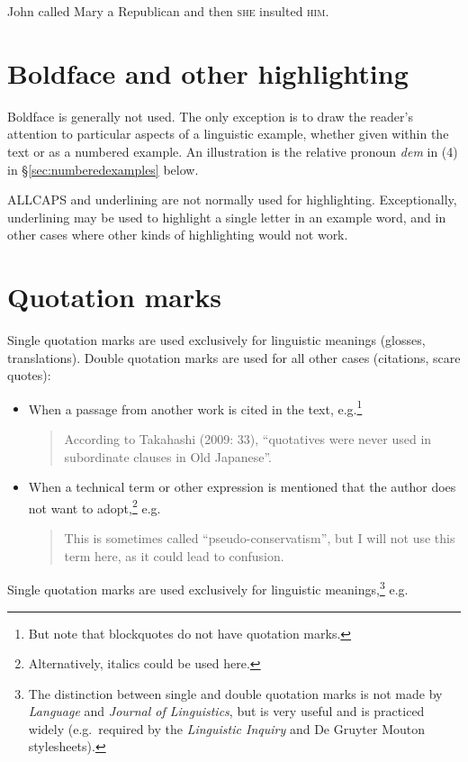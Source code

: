 \documentclass[a4paper]{article}
\newenvironment{gsrexq}{\begin{quote}\color{blue}}{\end{quote}}
\newcommand{\eagsr}{\bgroup\color{blue}\ea}
\newcommand{\zgsr}{\z\egroup}
\newcommand{\sectref}[1]{\S\ref{#1}}
\begin{document}
\eagsr
  John called Mary a Republican and then \textsc{she} insulted \textsc{him}.
\zgsr

\section{Boldface and other
highlighting}\label{sec:boldface-and-other-highlighting}

Boldface is generally not used. The only exception is to draw the
reader's attention to particular aspects of a linguistic example,
whether given within the text or as a numbered example. An illustration
is the relative pronoun \textit{dem} in (4) in \sectref{sec:numberedexamples} below. 

ALLCAPS and
underlining are not normally used for highlighting. Exceptionally,
underlining may be used to highlight a single letter in an example word,
and in other cases where other kinds of highlighting would not work.

\section{Quotation marks}\label{sec:quotation-marks}

Single quotation marks are used exclusively for linguistic meanings
(glosses, translations). Double quotation marks are used for all other
cases (citations, scare quotes):

\begin{itemize}
\item  When a passage from another work is cited in the text, e.g.\footnote{But note that blockquotes do not have quotation marks.}
    \begin{gsrexq} 
      According to Takahashi (2009: 33), ``quotatives were never used in subordinate clauses in Old Japanese''.
    \end{gsrexq}
\item When a technical term or other expression is mentioned that the author does not want to adopt,\footnote{Alternatively, italics could be used here.} e.g.
    \begin{gsrexq}
      This is sometimes called ``pseudo-conservatism'', but I will not use this term here, as it could lead to confusion.
    \end{gsrexq}
\end{itemize}

Single quotation marks are used exclusively for
linguistic meanings,\footnote{The distinction between single and double
quotation marks is not made by \textit{Language} and \textit{Journal of Linguistics}, but
is very useful and is practiced widely (e.g.~required by the \textit{Linguistic
Inquiry} and De Gruyter Mouton stylesheets).} e.g.
\end{document}
